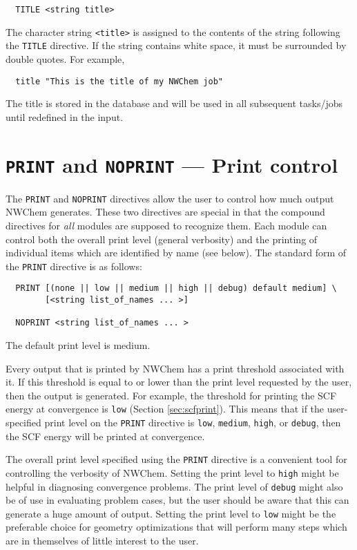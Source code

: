 \begin{verbatim}
  TITLE <string title>
\end{verbatim}

The character string \verb+<title>+ is assigned to the contents of the
string following the \verb+TITLE+ directive.  If the string contains
white space, it must be surrounded by double quotes.  For example,

\begin{verbatim}
  title "This is the title of my NWChem job"
\end{verbatim}

The title is stored in the database and will be used in all subsequent
tasks/jobs until redefined in the input.

\section{{\tt PRINT} and {\tt NOPRINT} --- Print control}
\label{sec:printcontrol}

The \verb+PRINT+ and \verb+NOPRINT+ directives allow the user to
control how much output NWChem generates.  These two directives are
special in that the compound directives for {\em all} modules are
supposed to recognize them. Each module can control both the overall
print level (general verbosity) and the printing of individual items
which are identified by name (see below).  The standard form of the
\verb+PRINT+ directive is as follows:

\begin{verbatim}
  PRINT [(none || low || medium || high || debug) default medium] \
        [<string list_of_names ... >]

  NOPRINT <string list_of_names ... >
\end{verbatim}
The default print level is medium.

Every output that is printed by NWChem has a print threshold
associated with it. If this threshold is equal to or lower than the
print level requested by the user, then the output is generated.  For
example, the threshold for printing the SCF energy at convergence is
\verb+low+ (Section \ref{sec:scfprint}).  This means that if the
user-specified print level on the \verb+PRINT+ directive is
\verb+low+, \verb+medium+, \verb+high+, or \verb+debug+, then the SCF
energy will be printed at convergence.

The overall print level specified
using the \verb+PRINT+ directive is a convenient tool for controlling 
the verbosity
of NWChem. Setting the print level to \verb+high+ might be helpful in
diagnosing convergence problems.  The print level of \verb+debug+ might
also be of use in evaluating problem cases, but the user should be aware
that this can generate a huge amount of output.  Setting the print level
to \verb+low+ might be the preferable choice for geometry
optimizations that will perform many steps which are in themselves of
little interest to the user.


